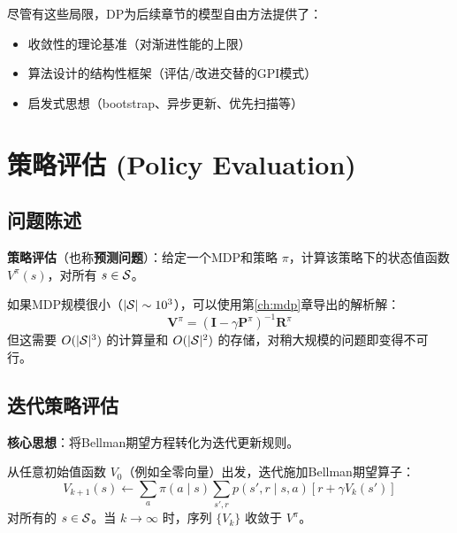 尽管有这些局限，DP为后续章节的模型自由方法提供了：
\begin{itemize}
    \item 收敛性的理论基准（对渐进性能的上限）
    \item 算法设计的结构性框架（评估/改进交替的GPI模式）
    \item 启发式思想（bootstrap、异步更新、优先扫描等）
\end{itemize}

\section{策略评估 (Policy Evaluation)}

\subsection{问题陈述}

\textbf{策略评估}（也称\textbf{预测问题}）：给定一个MDP和策略 $\pi$，计算该策略下的状态值函数 $V^{\pi}(s)$，对所有 $s \in \mathcal{S}$。

如果MDP规模很小（$|\mathcal{S}| \sim 10^3$），可以使用第\ref{ch:mdp}章导出的解析解：
\[
\mathbf{V}^{\pi} = (\mathbf{I} - \gamma \mathbf{P}^{\pi})^{-1} \mathbf{R}^{\pi}
\]
但这需要 $O(|\mathcal{S}|^3)$ 的计算量和 $O(|\mathcal{S}|^2)$ 的存储，对稍大规模的问题即变得不可行。

\subsection{迭代策略评估}

\textbf{核心思想}：将Bellman期望方程转化为迭代更新规则。

从任意初始值函数 $V_0$（例如全零向量）出发，迭代施加Bellman期望算子：
\[
V_{k+1}(s) \leftarrow \sum_{a} \pi(a \mid s) \sum_{s', r} p(s', r \mid s, a) \left[ r + \gamma V_k(s') \right]
\]
对所有的 $s \in \mathcal{S}$。当 $k \to \infty$ 时，序列 $\{V_k\}$ 收敛于 $V^{\pi}$。

